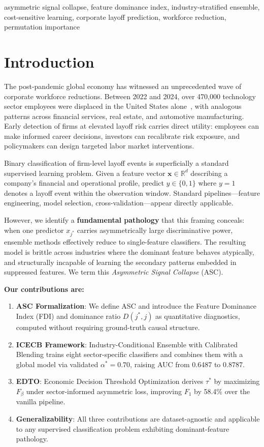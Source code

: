 \documentclass[conference]{IEEEtran}
\begin{document}
\begin{IEEEkeywords}
asymmetric signal collapse, feature dominance index, industry-stratified ensemble, cost-sensitive learning, corporate layoff prediction, workforce reduction, permutation importance
\end{IEEEkeywords}

\section{Introduction}
\label{sec:intro}

The post-pandemic global economy has witnessed an unprecedented wave of corporate workforce reductions. Between 2022 and 2024, over 470,000 technology sector employees were displaced in the United States alone~\cite{b1}, with analogous patterns across financial services, real estate, and automotive manufacturing. Early detection of firms at elevated layoff risk carries direct utility: employees can make informed career decisions, investors can recalibrate risk exposure, and policymakers can design targeted labor market interventions.

Binary classification of firm-level layoff events is superficially a standard supervised learning problem. Given a feature vector $\mathbf{x} \in \mathbb{R}^d$ describing a company's financial and operational profile, predict $y \in \{0,1\}$ where $y=1$ denotes a layoff event within the observation window. Standard pipelines---feature engineering, model selection, cross-validation---appear directly applicable.

However, we identify a \textbf{fundamental pathology} that this framing conceals: when one predictor $x_{j^*}$ carries asymmetrically large discriminative power, ensemble methods effectively reduce to single-feature classifiers. The resulting model is brittle across industries where the dominant feature behaves atypically, and structurally incapable of learning the secondary patterns embedded in suppressed features. We term this \textit{Asymmetric Signal Collapse} (ASC).

\textbf{Our contributions are:}
\begin{enumerate}
\item \textbf{ASC Formalization}: We define ASC and introduce the Feature Dominance Index (FDI) and dominance ratio $D(j^*, j)$ as quantitative diagnostics, computed without requiring ground-truth causal structure.
\item \textbf{ICECB Framework}: Industry-Conditional Ensemble with Calibrated Blending trains eight sector-specific classifiers and combines them with a global model via validated $\alpha^* = 0.70$, raising AUC from 0.6487 to 0.8787.
\item \textbf{EDTO}: Economic Decision Threshold Optimization derives $\tau^*$ by maximizing $F_\beta$ under sector-informed asymmetric loss, improving $F_1$ by 58.4\% over the vanilla pipeline.
\item \textbf{Generalizability}: All three contributions are dataset-agnostic and applicable to any supervised classification problem exhibiting dominant-feature pathology.
\end{enumerate}
\end{document}
